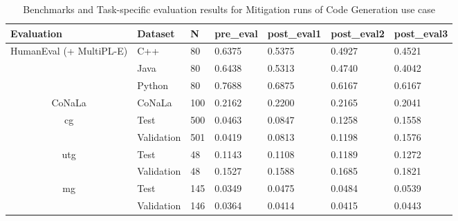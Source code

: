 \begin{table}[H]
\centering
\caption{Benchmarks and Task-specific evaluation results for Mitigation runs of Code Generation use case}
\begin{tabular}{|c|l|l|l|l|l|l|}
\hline
\multicolumn{1}{|l|}{\textbf{Evaluation}}  & \textbf{Dataset} & N   & \textbf{pre\_eval} & \textbf{post\_eval1} & \textbf{post\_eval2} & \textbf{post\_eval3} \\ \hline
\multirow{3}{*}{HumanEval   (+ MultiPL-E)} & C++              & 80  & 0.6375             & 0.5375               & 0.4927               & 0.4521               \\ \cline{2-7} 
                                           & Java             & 80  & 0.6438             & 0.5313               & 0.4740               & 0.4042               \\ \cline{2-7} 
                                           & Python           & 80  & 0.7688             & 0.6875               & 0.6167               & 0.6167               \\ \hline
CoNaLa                                     & CoNaLa           & 100 & 0.2162             & 0.2200               & 0.2165               & 0.2041               \\ \hline
\multirow{2}{*}{cg}                        & Test             & 500 & 0.0463             & 0.0847               & 0.1258               & 0.1558               \\ \cline{2-7} 
                                           & Validation       & 501 & 0.0419             & 0.0813               & 0.1198               & 0.1576               \\ \hline
\multirow{2}{*}{utg}                       & Test             & 48  & 0.1143             & 0.1108               & 0.1189               & 0.1272               \\ \cline{2-7} 
                                           & Validation       & 48  & 0.1527             & 0.1588               & 0.1685               & 0.1821               \\ \hline
\multirow{2}{*}{mg}                        & Test             & 145 & 0.0349             & 0.0475               & 0.0484               & 0.0539               \\ \cline{2-7} 
                                           & Validation       & 146 & 0.0364             & 0.0414               & 0.0415               & 0.0443               \\ \hline
\end{tabular}
\label{tab:CodeMitigationCombined}
\end{table}



